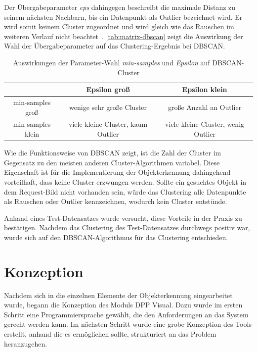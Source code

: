 \documentclass[
    type=Prakikumsbericht,
    status=draft, %
    language=german, %
    bibengine=bibtex,
]{unibwm-inf-thesis}
\begin{document}
    Der Übergabeparameter \textit{eps} dahingegen beschreibt die maximale Distanz zu seinem nächsten Nachbarn, bis ein Datenpunkt als Outlier bezeichnet wird.
    Er wird somit keinem Cluster zugeordnet und wird gleich wie das Rauschen im weiteren Verlauf nicht beachtet~\citep{Bedre2022}.
    \autoref{tab:matrix-dbscan} zeigt die Auswirkung der Wahl der Übergabeparameter auf das Clustering-Ergebnis bei \ac{DBSCAN}.
    \begin{table}[h]
        \centering
        \begin{tabular}{c | c | c}
            & Epsilon groß & Epsilon klein \\ \hline
            min-samples groß & wenige sehr große Cluster & große Anzahl an Outlier\\ \hline
            min-samples klein & viele kleine Cluster, kaum Outlier & viele kleine Cluster, wenig Outlier
        \end{tabular}
        \caption{Auswirkungen der Parameter-Wahl \textit{min-samples} und \textit{Epsilon} auf \ac{DBSCAN}-Cluster}
        \label{tab:matrix-dbscan}
    \end{table}

    Wie die Funktionsweise von \ac{DBSCAN} zeigt, ist die Zahl der Cluster im Gegensatz zu den meisten anderen Cluster-Algorithmen variabel.
    Diese Eigenschaft ist für die Implementierung der Objekterkennung dahingehend vorteilhaft, dass keine Cluster \glqq erzwungen\grqq{} werden.
    Sollte ein gesuchtes Objekt in dem Request-Bild nicht vorhanden sein, würde das Clustering alle Datenpunkte als Rauschen oder Outlier kennzeichnen, wodurch kein Cluster entstünde.

    Anhand eines Test-Datensatzes wurde versucht, diese Vorteile in der Praxis zu bestätigen.
    Nachdem das Clustering des Test-Datensatzes durchwegs positiv war, wurde sich auf den \ac{DBSCAN}-Algorithmus für das Clustering entschieden.

    
    \section{Konzeption}
    Nachdem sich in die einzelnen Elemente der Objekterkennung eingearbeitet wurde, begann die Konzeption des Moduls \ac{DPP} Visual.
    Dazu wurde im ersten Schritt eine Programmiersprache gewählt, die den Anforderungen an das System gerecht werden kann.
    Im nächsten Schritt wurde eine grobe Konzeption des Tools erstellt, anhand die es ermöglichen sollte, strukturiert an das Problem heranzugehen.
\end{document}
